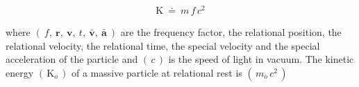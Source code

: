 \documentclass[10pt,fleqn]{article}
\begin{document}
\vspace{-0.30em}
\begin{eqnarray*}
\mathrm{K} ~\doteq~ m \, f \, c^2
\end{eqnarray*}
\par \vspace{+0.90em}
\noindent where $( \: f, \: \mathbf{r}, \: \mathbf{v}, \: t, \: \bar{\mathbf{v}}, \: \bar{\mathbf{a}} \: )$ are the frequency factor, the relational position, the relational velocity, the relational time, the special velocity and the special acceleration of the particle and $( \, c \, )$ is the speed of light in vacuum. The kinetic energy $( \, \mathrm{K}_o \, )$ of a massive particle at relational rest is $( \, m_o \, c^2 \, )$

\newpage

\par {}

\bigskip \smallskip
\end{document}
